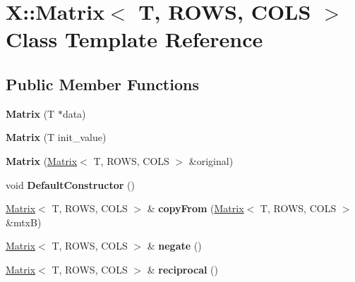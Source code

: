 \hypertarget{class_x_1_1_matrix}{\section{X\-:\-:Matrix$<$ T, R\-O\-W\-S, C\-O\-L\-S $>$ Class Template Reference}
\label{class_x_1_1_matrix}
}
\subsection*{Public Member Functions}
\begin{DoxyCompactItemize}
\item 
\hypertarget{class_x_1_1_matrix_ab75b1d2bc186c792b11626696cf2c47e}{{\bfseries Matrix} (T $\ast$data)}\label{class_x_1_1_matrix_ab75b1d2bc186c792b11626696cf2c47e}

\item 
\hypertarget{class_x_1_1_matrix_af8410e867fae9f62d5587a28122f1ace}{{\bfseries Matrix} (T init\-\_\-value)}\label{class_x_1_1_matrix_af8410e867fae9f62d5587a28122f1ace}

\item 
\hypertarget{class_x_1_1_matrix_aacd5faf4f5c633c6d54aeb656da0d743}{{\bfseries Matrix} (\hyperlink{class_x_1_1_matrix}{Matrix}$<$ T, R\-O\-W\-S, C\-O\-L\-S $>$ \&original)}\label{class_x_1_1_matrix_aacd5faf4f5c633c6d54aeb656da0d743}

\item 
\hypertarget{class_x_1_1_matrix_a9f1d9bd53f9e5c0c34e09cba0e11dc97}{void {\bfseries Default\-Constructor} ()}\label{class_x_1_1_matrix_a9f1d9bd53f9e5c0c34e09cba0e11dc97}

\item 
\hypertarget{class_x_1_1_matrix_a2e89dff425c5ed24a83758ab91d37c4d}{\hyperlink{class_x_1_1_matrix}{Matrix}$<$ T, R\-O\-W\-S, C\-O\-L\-S $>$ \& {\bfseries copy\-From} (\hyperlink{class_x_1_1_matrix}{Matrix}$<$ T, R\-O\-W\-S, C\-O\-L\-S $>$ \&mtx\-B)}\label{class_x_1_1_matrix_a2e89dff425c5ed24a83758ab91d37c4d}

\item 
\hypertarget{class_x_1_1_matrix_ab78d80b8ca8247ee02f34a8269fd54d1}{\hyperlink{class_x_1_1_matrix}{Matrix}$<$ T, R\-O\-W\-S, C\-O\-L\-S $>$ \& {\bfseries negate} ()}\label{class_x_1_1_matrix_ab78d80b8ca8247ee02f34a8269fd54d1}

\item 
\hypertarget{class_x_1_1_matrix_a19fe6c74400a6bd42ae7ee9e08aea35f}{\hyperlink{class_x_1_1_matrix}{Matrix}$<$ T, R\-O\-W\-S, C\-O\-L\-S $>$ \& {\bfseries reciprocal} ()}\label{class_x_1_1_matrix_a19fe6c74400a6bd42ae7ee9e08aea35f}


\end{DoxyCompactItemize}
